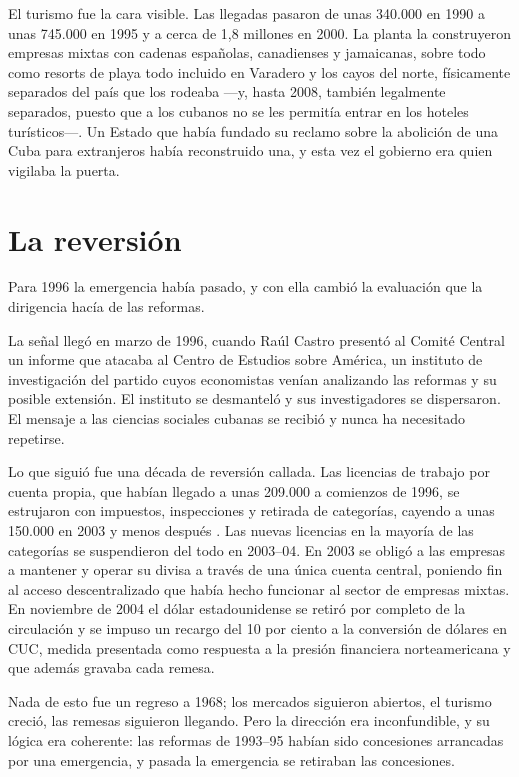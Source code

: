 El turismo fue la cara visible. Las llegadas pasaron de unas 340.000 en 1990 a
unas 745.000 en 1995 y a cerca de 1,8 millones en 2000.\unv{} La planta la
construyeron empresas mixtas con cadenas españolas, canadienses y jamaicanas,
sobre todo como resorts de playa todo incluido en Varadero y los cayos del norte,
físicamente separados del país que los rodeaba ---y, hasta 2008, también
legalmente separados, puesto que a los cubanos no se les permitía entrar en los
hoteles turísticos---. Un Estado que había fundado su reclamo sobre la abolición
de una Cuba para extranjeros había reconstruido una, y esta vez el gobierno era
quien vigilaba la puerta.

\section{La reversión}

Para 1996 la emergencia había pasado, y con ella cambió la evaluación que la
dirigencia hacía de las reformas.

La señal llegó en marzo de 1996, cuando Raúl Castro presentó al Comité Central un
informe que atacaba al Centro de Estudios sobre América, un instituto de
investigación del partido cuyos economistas venían analizando las reformas y su
posible extensión. El instituto se desmanteló y sus investigadores se dispersaron.
El mensaje a las ciencias sociales cubanas se recibió y nunca ha necesitado
repetirse.

Lo que siguió fue una década de reversión callada. Las licencias de trabajo por
cuenta propia, que habían llegado a unas 209.000 a comienzos de 1996, se
estrujaron con impuestos, inspecciones y retirada de categorías, cayendo a unas
150.000 en 2003 y menos después \citep{ritter2015}.\unv{} Las nuevas licencias en
la mayoría de las categorías se suspendieron del todo en 2003--04. En 2003 se
obligó a las empresas a mantener y operar su divisa a través de una única cuenta
central, poniendo fin al acceso descentralizado que había hecho funcionar al
sector de empresas mixtas. En noviembre de 2004 el dólar estadounidense se retiró
por completo de la circulación y se impuso un recargo del 10 por ciento a la
conversión de dólares en CUC, medida presentada como respuesta a la presión
financiera norteamericana y que además gravaba cada remesa.

Nada de esto fue un regreso a 1968; los mercados siguieron abiertos, el turismo
creció, las remesas siguieron llegando. Pero la dirección era inconfundible, y su
lógica era coherente: las reformas de 1993--95 habían sido concesiones arrancadas
por una emergencia, y pasada la emergencia se retiraban las concesiones.

